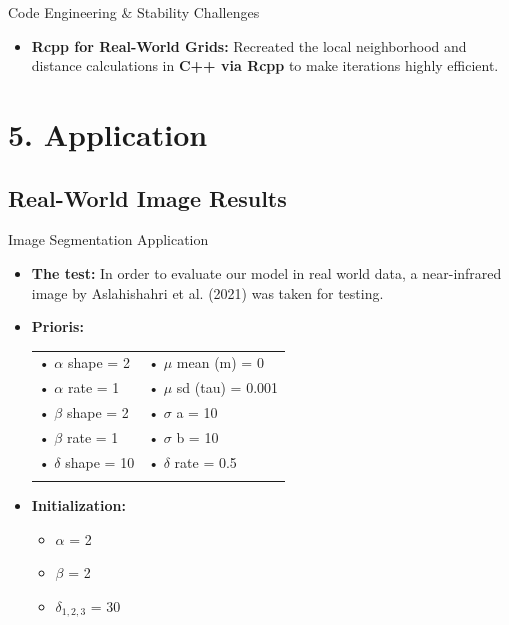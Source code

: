 \documentclass[
  ignorenonframetext,
]{beamer}
\providecommand{\tightlist}{%
  \setlength{\itemsep}{0pt}\setlength{\parskip}{0pt}}\usepackage{longtable,booktabs,array}
\begin{document}
\begin{frame}{Code Engineering \& Stability Challenges}
\label{code-engineering-stability-challenges}
\begin{itemize}
\tightlist
\item
  \textbf{Rcpp for Real-World Grids:} Recreated the local neighborhood
  and distance calculations in \textbf{C++ via Rcpp} to make iterations
  highly efficient.
\end{itemize}
\end{frame}

\section{5. Application}\label{application}

\subsection{Real-World Image Results}\label{real-world-image-results}

\begin{frame}{Image Segmentation Application}
\label{image-segmentation-application}
\begin{itemize}
\item
  \textbf{The test:} In order to evaluate our model in real world data,
  a near-infrared image by Aslahishahri et al. (2021) was taken for
  testing.
\item
  \textbf{Prioris:}

  \begin{longtable}[]{@{}ll@{}}
  \toprule\noalign{}
  \endhead
  • \(\alpha\) shape = 2 & • \(\mu\) mean (m) = 0 \\
  • \(\alpha\) rate = 1 & • \(\mu\) sd (tau) = 0.001 \\
  • \(\beta\) shape = 2 & • \(\sigma\) a = 10 \\
  • \(\beta\) rate = 1 & • \(\sigma\) b = 10 \\
  • \(\delta\) shape = 10 & • \(\delta\) rate = 0.5 \\
  \bottomrule\noalign{}
  \end{longtable}
\item
  \textbf{Initialization:}

  \begin{itemize}
  \tightlist
  \item
    \(\alpha\) = 2
  \item
    \(\beta\) = 2
  \item
    \(\delta_{1,2,3}\) = 30
  \end{itemize}
\end{itemize}
\end{frame}
\end{document}
